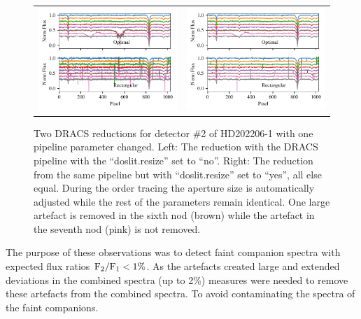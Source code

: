 \begin{figure}
    \centering
    \begin{tabular}{cc}
        \includegraphics[width=0.5\linewidth]{figures/reduction/bp_plots/non_resized_nods_HD202206-1_chip_2} & \includegraphics[width=0.5\linewidth]{figures/reduction/bp_plots/resized_nods_HD202206-1_chip_2}\\
    \end{tabular}\label{fig:resizednods}
    \caption{Two {DRACS} reductions for detector \#2 of HD202206-1 with one pipeline parameter changed.
        Left: The reduction with the DRACS pipeline with the ``doslit.resize'' set to ``no''.
        Right: The reduction from the same pipeline but with ``doslit.resize'' set to ``yes'', all else equal.
        During the order tracing the aperture size is automatically adjusted while the rest of the parameters remain identical.
        One large artefact is removed in the sixth nod (brown) while the artefact in the seventh nod (pink) is not removed.}
\end{figure}

The purpose of these observations was to detect faint companion spectra with expected flux ratios \(\rm {F_2}/{F_1} < 1\%\).
As the artefacts created large and extended deviations in the combined spectra (up to 2\%) measures were needed to remove these artefacts from the combined spectra.
To avoid contaminating the spectra of the faint companions.

